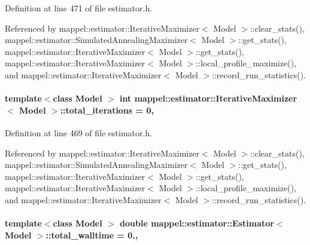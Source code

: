 Definition at line 471 of file estimator.\+h.



Referenced by mappel\+::estimator\+::\+Iterative\+Maximizer$<$ Model $>$\+::clear\+\_\+stats(), mappel\+::estimator\+::\+Simulated\+Annealing\+Maximizer$<$ Model $>$\+::get\+\_\+stats(), mappel\+::estimator\+::\+Iterative\+Maximizer$<$ Model $>$\+::get\+\_\+stats(), mappel\+::estimator\+::\+Iterative\+Maximizer$<$ Model $>$\+::local\+\_\+profile\+\_\+maximize(), and mappel\+::estimator\+::\+Iterative\+Maximizer$<$ Model $>$\+::record\+\_\+run\+\_\+statistics().

\paragraph[{\texorpdfstring{total\+\_\+iterations}{total_iterations}}]{\setlength{\rightskip}{0pt plus 5cm}template$<$class Model $>$ int {\bf mappel\+::estimator\+::\+Iterative\+Maximizer}$<$ Model $>$\+::total\+\_\+iterations = 0\hspace{0.3cm}{\ttfamily [protected]}, {\ttfamily [inherited]}}\hypertarget{classmappel_1_1estimator_1_1IterativeMaximizer_a14a3683e595e1db79b9cbc49b0d8688e}{}\label{classmappel_1_1estimator_1_1IterativeMaximizer_a14a3683e595e1db79b9cbc49b0d8688e}


Definition at line 469 of file estimator.\+h.



Referenced by mappel\+::estimator\+::\+Iterative\+Maximizer$<$ Model $>$\+::clear\+\_\+stats(), mappel\+::estimator\+::\+Simulated\+Annealing\+Maximizer$<$ Model $>$\+::get\+\_\+stats(), mappel\+::estimator\+::\+Iterative\+Maximizer$<$ Model $>$\+::get\+\_\+stats(), mappel\+::estimator\+::\+Iterative\+Maximizer$<$ Model $>$\+::local\+\_\+profile\+\_\+maximize(), and mappel\+::estimator\+::\+Iterative\+Maximizer$<$ Model $>$\+::record\+\_\+run\+\_\+statistics().

\paragraph[{\texorpdfstring{total\+\_\+walltime}{total_walltime}}]{\setlength{\rightskip}{0pt plus 5cm}template$<$class Model $>$ double {\bf mappel\+::estimator\+::\+Estimator}$<$ Model $>$\+::total\+\_\+walltime = 0.\hspace{0.3cm}{\ttfamily [protected]}, {\ttfamily [inherited]}}\hypertarget{classmappel_1_1estimator_1_1Estimator_a98ad459e850aeb2c42c10fd06c3b9fbc}{}\label{classmappel_1_1estimator_1_1Estimator_a98ad459e850aeb2c42c10fd06c3b9fbc}


